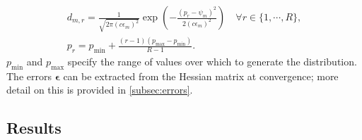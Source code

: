 \begin{subequations}
    \begin{gather}
        d_{m,r} = \frac{1}{\sqrt{2 \pi (c \epsilon_m)^2}}
        \exp\left(
            - \frac{(p_r - \psi_m)^2}{2 (c \epsilon_m)^2}
        \right)\quad \forall r \in \lbrace 1, \cdots, R \rbrace,\\
        p_r = p_{\text{min}} + \frac{(r-1) (p_{\text{max}} - p_{\text{min}})}{R-1}.
    \end{gather}
    \label{eq:distribution}%
\end{subequations}
$p_{\text{min}}$ and $p_{\text{max}}$ specify the range of values over which to
generate the distribution.
The errors $\symbf{\epsilon}$ can be extracted from the Hessian matrix at
convergence; more detail on this is provided in \cref{subsec:errors}.

\subsection{Results}
\label{subsec:seq-results}
